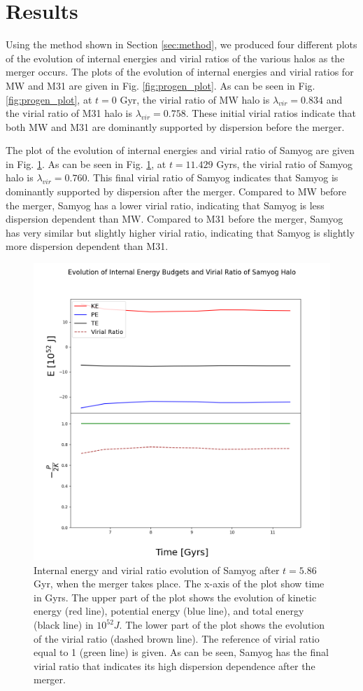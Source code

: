 \documentclass[twocolumn]{aastex631}
\begin{document}
\section{Results}
\label{sec:res}

Using the method shown in Section \ref{sec:method}, we produced four different plots of the evolution of internal energies and virial ratios of the various halos as the merger occurs. The plots of the evolution of internal energies and virial ratios for MW and M31 are given in Fig. \ref{fig:progen_plot}. As can be seen in Fig. \ref{fig:progen_plot}, at $t=0$ Gyr, the virial ratio of MW halo is $\lambda_{vir} = 0.834$ and the virial ratio of M31 halo is $\lambda_{vir} = 0.758$. These initial virial ratios indicate that both MW and M31 are dominantly supported by dispersion before the merger.

The plot of the evolution of internal energies and virial ratio of Samyog are given in Fig. \ref{fig:Samyog_plot}. As can be seen in Fig. \ref{fig:Samyog_plot}, at $t=11.429$ Gyrs, the virial ratio of Samyog halo is $\lambda_{vir} = 0.760$. This final virial ratio of Samyog indicates that Samyog is dominantly supported by dispersion after the merger. Compared to MW before the merger, Samyog has a lower virial ratio, indicating that Samyog is less dispersion dependent than MW. Compared to M31 before the merger, Samyog has very similar but slightly higher virial ratio, indicating that Samyog is slightly more dispersion dependent than M31.

\begin{figure}[htbp]
\includegraphics[width=.5\textwidth]{Samyog_energies_virial_ratios.png}
\caption{Internal energy and virial ratio evolution of Samyog after $t=5.86$ Gyr, when the merger takes place. The x-axis of the plot show time in Gyrs. The upper part of the plot shows the evolution of kinetic energy (red line), potential energy (blue line), and total energy (black line) in $10^{52} J$. The lower part of the plot shows the evolution of the virial ratio (dashed brown line). The reference of virial ratio equal to 1 (green line) is given. As can be seen, Samyog has the final virial ratio that indicates its high dispersion dependence after the merger.
\label{fig:Samyog_plot}}
\end{figure}
\end{document}
